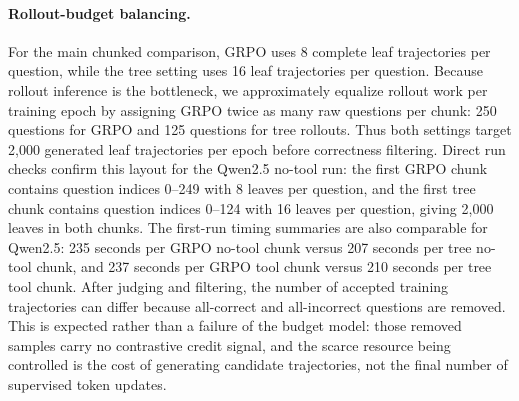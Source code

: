 \documentclass{article}
\begin{document}
\paragraph{Rollout-budget balancing.}
For the main chunked comparison, GRPO uses 8 complete leaf trajectories per question, while the tree setting uses 16 leaf trajectories per question. Because rollout inference is the bottleneck, we approximately equalize rollout work per training epoch by assigning GRPO twice as many raw questions per chunk: 250 questions for GRPO and 125 questions for tree rollouts. Thus both settings target 2{,}000 generated leaf trajectories per epoch before correctness filtering. Direct run checks confirm this layout for the Qwen2.5 no-tool run: the first GRPO chunk contains question indices 0--249 with 8 leaves per question, and the first tree chunk contains question indices 0--124 with 16 leaves per question, giving 2{,}000 leaves in both chunks. The first-run timing summaries are also comparable for Qwen2.5: 235 seconds per GRPO no-tool chunk versus 207 seconds per tree no-tool chunk, and 237 seconds per GRPO tool chunk versus 210 seconds per tree tool chunk. After judging and filtering, the number of accepted training trajectories can differ because all-correct and all-incorrect questions are removed. This is expected rather than a failure of the budget model: those removed samples carry no contrastive credit signal, and the scarce resource being controlled is the cost of generating candidate trajectories, not the final number of supervised token updates.
\end{document}
